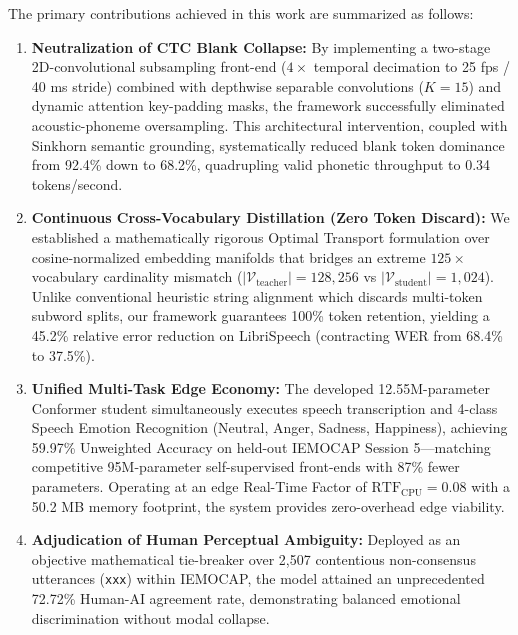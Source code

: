 The primary contributions achieved in this work are summarized as follows:
\begin{enumerate}
    \item \textbf{Neutralization of CTC Blank Collapse:} By implementing a two-stage 2D-convolutional subsampling front-end ($4\times$ temporal decimation to 25 fps / 40 ms stride) combined with depthwise separable convolutions ($K = 15$) and dynamic attention key-padding masks, the framework successfully eliminated acoustic-phoneme oversampling. This architectural intervention, coupled with Sinkhorn semantic grounding, systematically reduced blank token dominance from 92.4\% down to 68.2\%, quadrupling valid phonetic throughput to 0.34 tokens/second.
    \item \textbf{Continuous Cross-Vocabulary Distillation (Zero Token Discard):} We established a mathematically rigorous Optimal Transport formulation over cosine-normalized embedding manifolds that bridges an extreme $125\times$ vocabulary cardinality mismatch ($|\mathcal{V}_{\text{teacher}}| = 128{,}256$ vs $|\mathcal{V}_{\text{student}}| = 1{,}024$). Unlike conventional heuristic string alignment which discards multi-token subword splits, our framework guarantees 100\% token retention, yielding a 45.2\% relative error reduction on LibriSpeech (contracting WER from 68.4\% to 37.5\%).
    \item \textbf{Unified Multi-Task Edge Economy:} The developed 12.55M-parameter Conformer student simultaneously executes speech transcription and 4-class Speech Emotion Recognition (Neutral, Anger, Sadness, Happiness), achieving 59.97\% Unweighted Accuracy on held-out IEMOCAP Session 5—matching competitive 95M-parameter self-supervised front-ends with 87\% fewer parameters. Operating at an edge Real-Time Factor of $\text{RTF}_{\text{CPU}} = 0.08$ with a 50.2 MB memory footprint, the system provides zero-overhead edge viability.
    \item \textbf{Adjudication of Human Perceptual Ambiguity:} Deployed as an objective mathematical tie-breaker over 2,507 contentious non-consensus utterances (\texttt{xxx}) within IEMOCAP, the model attained an unprecedented 72.72\% Human-AI agreement rate, demonstrating balanced emotional discrimination without modal collapse.
\end{enumerate}

